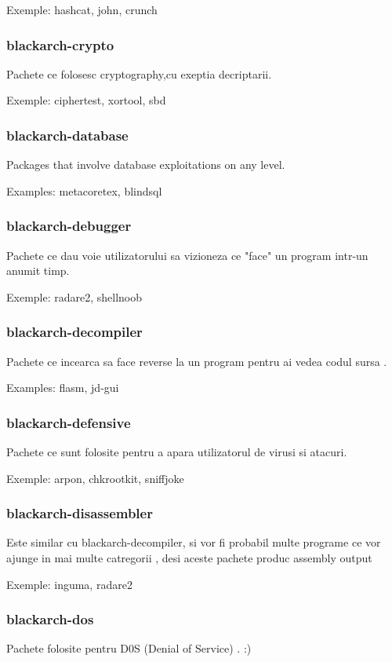 \documentclass[a4paper, oneside, 11pt]{book}
\begin{document}
Exemple: hashcat, john, crunch

\subsubsection{blackarch-crypto}
Pachete ce folosesc  cryptography,cu exeptia decriptarii.

Exemple: ciphertest, xortool, sbd

\subsubsection{blackarch-database}
Packages that involve database exploitations on any level.

Examples: metacoretex, blindsql

\subsubsection{blackarch-debugger}
Pachete ce dau voie utilizatorului sa vizioneza ce "face" un program intr-un anumit timp.

Exemple: radare2, shellnoob

\subsubsection{blackarch-decompiler}
Pachete ce incearca sa face  reverse la un program pentru ai vedea codul sursa .

Examples: flasm, jd-gui

\subsubsection{blackarch-defensive}
Pachete ce sunt folosite pentru a apara utilizatorul de virusi si atacuri.

Exemple: arpon, chkrootkit, sniffjoke

\subsubsection{blackarch-disassembler}
Este similar cu blackarch-decompiler, si vor fi probabil multe programe ce vor ajunge in mai multe catregorii , desi aceste pachete produc assembly output

Exemple: inguma, radare2

\subsubsection{blackarch-dos}
Pachete folosite pentru D0S  (Denial of Service) . :)
\end{document}
